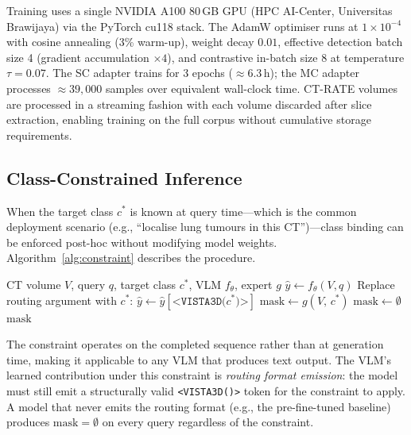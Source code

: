 \documentclass[lineno,referee,pdflatex,sn-mathphys-num]{sn-jnl}
\begin{document}
Training uses a single NVIDIA A100 80\,GB GPU (HPC AI-Center,
Universitas Brawijaya) via the PyTorch cu118 stack. The AdamW optimiser
runs at $1\times 10^{-4}$ with cosine annealing (3\% warm-up), weight
decay $0.01$, effective detection batch size 4 (gradient accumulation
$\times 4$), and contrastive in-batch size 8 at temperature
$\tau = 0.07$. The SC adapter trains for 3 epochs (${\approx}6.3$\,h);
the MC adapter processes ${\approx}39{,}000$ samples over equivalent
wall-clock time. CT-RATE volumes are processed in a streaming fashion
with each volume discarded after slice extraction, enabling training on
the full corpus without cumulative storage requirements.

\subsection{Class-Constrained Inference}
\label{sec:constraint}

When the target class $c^*$ is known at query time---which is the common
deployment scenario (e.g., ``localise lung tumours in this CT'')---class
binding can be enforced post-hoc without modifying model weights.
Algorithm~\ref{alg:constraint} describes the procedure.

\begin{algorithm}[h]
\caption{Class-constrained inference}
\label{alg:constraint}
\begin{algorithmic}[1]
\Require CT volume $V$, query $q$, target class $c^*$, VLM $f_\theta$, expert $g$
\State $\hat{y} \leftarrow f_\theta(V, q)$  
    \State Replace routing argument with $c^*$:
           $\hat{y} \leftarrow \hat{y}[\texttt{<VISTA3D(}c^*\texttt{)>}]$
    \State $\mathrm{mask} \leftarrow g(V,\, c^*)$  
\Else
    \State $\mathrm{mask} \leftarrow \emptyset$   
\EndIf
\State \Return $\mathrm{mask}$
\end{algorithmic}
\end{algorithm}

The constraint operates on the completed sequence rather than at
generation time, making it applicable to any VLM that produces text
output. The VLM's learned contribution under this constraint is
\emph{routing format emission}: the model must still emit a structurally
valid \texttt{<VISTA3D(\textellipsis)>} token for the constraint to apply.
A model that never emits the routing format (e.g., the pre-fine-tuned
baseline) produces $\mathrm{mask}=\emptyset$ on every query regardless
of the constraint.
\end{document}
